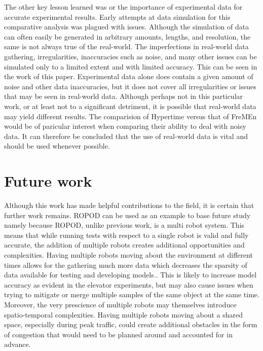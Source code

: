     The other key lesson learned was or the importance of experimental
    data for accurate experimental results. Early attempts at data simulation
    for this comparative analysis was plagued with issues. Although
    the simulation of data can often easily be generated in arbitrary amounts,
    lengths, and resolution, the same is not always true of the real-world.
    The imperfections in real-world data gathering, irregularities,
    inaccuracies such as noise, and many other issues can be simulated
    only to a limited extent and with limited accuracy. This can be seen in the
    work of this paper. Experimental data alone does contain a given amount of noise
    and other data inaccuracies, but it does not cover all irregularities or
    issues that may be seen in real-world data. Although perhaps not in this
    particular work, or at least not to a significant detriment, it is possible that
    real-world data may yield different results. The comparision of Hypertime
    versus that of FreMEn would be of paricular interest when comparing their
    ability to deal with noisy data. It can therefore be concluded that the
    use of real-world data is vital and should be used whenever possible. \\

    \section{ Future work }

    Although this work has made helpful contributions to the field, it is
    certain that further work remains. ROPOD can be used as an example
    to base future study namely because ROPOD, unlike previous work, is a multi robot
    system. This means that while running tests with respect to a single robot
    is valid and fully accurate, the addition of multiple robots creates
    additional opportunities and complexities. Having multiple robots moving about
    the environment at different times allows for the gathering much
    more data which decreases the sparsity of data
    available for testing and developing models.. This is likely to increase model accuracy as evident in the
    elevator experiments, but may also cause issues when trying to mitigate
    or merge multiple samples of the same object at the same time. Moreover,
    the very prescience of multiple robots may themselves introduce spatio-temporal
    complexities. Having multiple robots moving about a shared
    space, especially during peak traffic, could create additional obstacles
    in the form of congestion that would need to be planned around
    and accounted for in advance. \\

